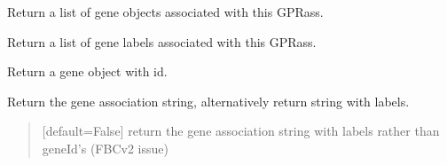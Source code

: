 \documentclass[letterpaper,12pt,english]{sphinxmanual}
\begin{document}
\begin{fulllineitems}
\begin{fulllineitems}
\end{fulllineitems}


\begin{fulllineitems}
\label{\detokenize{api/core:cbmpy.CBModel.GeneProteinAssociation.getGenes}}
\pysigstartsignatures
\pysiglinewithargsret
{}
{}
{}
\pysigstopsignatures
\sphinxAtStartPar
Return a list of gene objects associated with this GPRass.

\end{fulllineitems}


\begin{fulllineitems}
\label{\detokenize{api/core:cbmpy.CBModel.GeneProteinAssociation.getGeneLabels}}
\pysigstartsignatures
\pysiglinewithargsret
{}
{}
{}
\pysigstopsignatures
\sphinxAtStartPar
Return a list of gene labels associated with this GPRass.

\end{fulllineitems}


\begin{fulllineitems}
\label{\detokenize{api/core:cbmpy.CBModel.GeneProteinAssociation.getGene}}
\pysigstartsignatures
\pysiglinewithargsret
{}
{}
{}
\pysigstopsignatures
\sphinxAtStartPar
Return a gene object with id.

\end{fulllineitems}


\begin{fulllineitems}
\label{\detokenize{api/core:cbmpy.CBModel.GeneProteinAssociation.getAssociationStr}}
\pysigstartsignatures
\pysiglinewithargsret
{}
{}
{}
\pysigstopsignatures
\sphinxAtStartPar
Return the gene association string, alternatively return string with labels.
\begin{quote}\begin{description}
\sphinxAtStartPar
{} \textendash{} {[}default=False{]} return the gene association string with labels rather than geneId’s (FBCv2 issue)


\end{description}
\end{quote}
\end{fulllineitems}
\end{fulllineitems}
\end{document}
